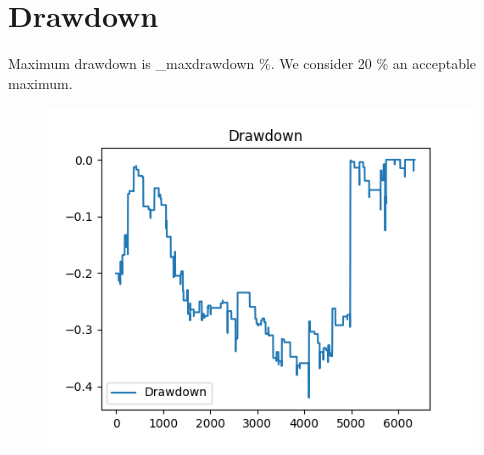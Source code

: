 \documentclass[a4paper]{article}
\begin{document}
\section{Drawdown}

Maximum drawdown is \constant_maxdrawdown \%. We consider 20 \% an acceptable maximum.

\begin{figure}[H]
    \begin{center}
        \includegraphics{../generated/drawdown.png}
    \end{center}
\end{figure}

\end{document}
